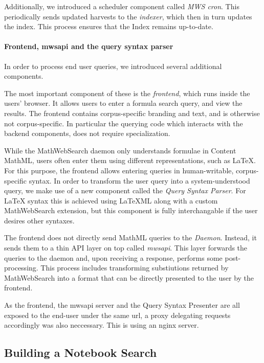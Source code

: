 Additionally, we introduced a scheduler component called \textit{MWS cron}. 
This periodically sends updated harvests to the \textit{indexer}, which then in turn updates the index. 
This process ensures that the Index remains up-to-date. 

\paragraph{Frontend, mwsapi and the query syntax parser}

In order to process end user queries, we introduced several additional components.

The most important component of these is the \textit{frontend}, which runs inside the users' browser. 
It allows users to enter a formula search query, and view the results. 
The frontend contains corpus-specific branding and text, and is otherwise not corpus-specific. 
In particular the querying code which interacts with the backend components, does not require specialization. 

While the MathWebSearch daemon only understands formulae in Content MathML, users often enter them using different representations, such as \LaTeX. 
For this purpose, the frontend allows entering queries in human-writable, corpus-specific syntax. 
In order to transform the user query into a system-understood query, we make use of a new component called the \textit{Query Syntax Parser}. 
For {\LaTeX} syntax this is achieved using {\LaTeX}ML along with a custom MathWebSearch extension, but this component is fully interchangable if the user desires other syntaxes. 

The frontend does not directly send MathML queries to the \textit{Daemon}.
Instead, it sends them to a thin API layer on top called \textit{mwsapi}. 
This layer forwards the queries to the daemon and, upon receiving a response, performs some post-processing. 
This process includes transforming substiutions returned by MathWebSearch into a format that can be directly presented to the user by the frontend. 

As the frontend, the mwsapi server and the Query Syntax Presenter are all exposed to the end-user under the same url, a proxy delegating requests accordingly was also neccessary. 
This is using an nginx  server. 

\subsection{Building a Notebook Search}

